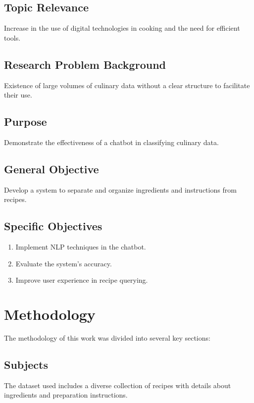 \documentclass[conference]{IEEEtran}
\begin{document}
\subsection{Topic Relevance}
Increase in the use of digital technologies in cooking and the need for efficient tools.

\subsection{Research Problem Background}
Existence of large volumes of culinary data without a clear structure to facilitate their use.

\subsection{Purpose}
Demonstrate the effectiveness of a chatbot in classifying culinary data.

\subsection{General Objective}
Develop a system to separate and organize ingredients and instructions from recipes.

\subsection{Specific Objectives}
\begin{enumerate}
    \item Implement NLP techniques in the chatbot.
    \item Evaluate the system's accuracy.
    \item Improve user experience in recipe querying.
\end{enumerate}

\section{Methodology}
The methodology of this work was divided into several key sections:

\subsection{Subjects}
The dataset used includes a diverse collection of recipes with details about ingredients and preparation instructions.
\end{document}
